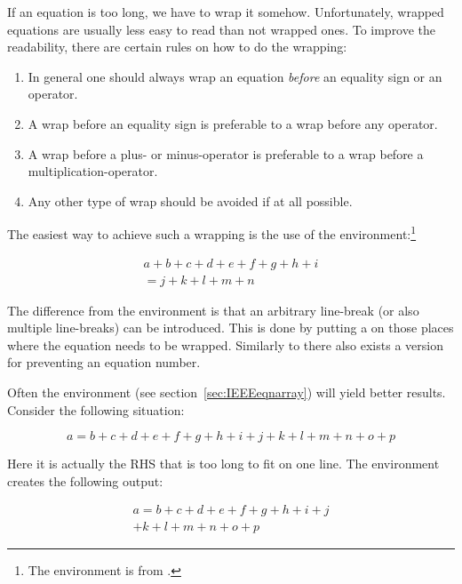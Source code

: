 If an equation is too long, we have to wrap it somehow. Unfortunately,
wrapped equations are usually less easy to read than not wrapped
ones. To improve the readability, there are certain rules on how to do
the wrapping:
\begin{enumerate}
\item In general one should always wrap an equation \emph{before} an
  equality sign or an operator.
\item A wrap before an equality sign is preferable to a wrap before
  any operator.
\item A wrap before a plus- or minus-operator is preferable to a wrap
  before a multiplication-operator.
\item Any other type of wrap should be avoided if at all possible.
\end{enumerate}
The easiest way to achieve such a wrapping is the use of the
 en\-vi\-ron\-ment:\footnote{The
   environment is from .}
\begin{example}
\begin{multline}
  a + b + c + d + e + f 
  + g + h + i  
  \\
  = j + k + l + m + n 
\end{multline}
\end{example}
\noindent
The difference from the  environment is that an arbitrary
line-break (or also multiple line-breaks) can be introduced. This is
done by putting a \ci{\bs} on those places where the equation needs
to be wrapped. Similarly to  there also exists a
 version for preventing an equation number.

Often the
 environment (see section~\ref{sec:IEEEeqnarray})
will yield better results.  Consider the following
situation:
\begin{example}
\begin{equation}
  a = b + c + d + e + f 
  + g + h + i + j 
  + k + l + m + n + o + p  
  \label{eq:equation_too_long}
\end{equation}
\end{example}
\noindent
Here it is actually the RHS that is too long to fit on one line. The
 environment creates the following output:
\begin{example}
\begin{multline}
  a = b + c + d + e + f 
  + g + h + i + j \\
  + k + l + m + n + o + p
\end{multline}
\end{example}

